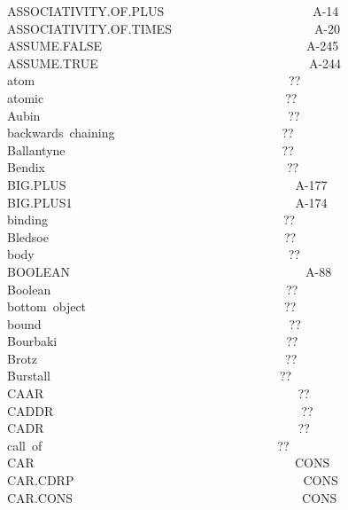 \documentclass[11pt]{book}
\newenvironment{pubasis}{\begin{flushleft}\ttfamily\small}{\normalsize\rmfamily\end{flushleft}}
\begin{document}
\begin{pubasis}
ASSOC\-IATIV\-ITY.OF.PLUS~~~~~~~~~~~~~~~~~~~~~~~~A-14\\
ASSOC\-IATIV\-ITY.OF.TIMES~~~~~~~~~~~~~~~~~~~~~~~A-20\\
AS\-SUME.FALSE~~~~~~~~~~~~~~~~~~~~~~~~~~~~~~~~~A-245\\
AS\-SUME.TRUE~~~~~~~~~~~~~~~~~~~~~~~~~~~~~~~~~~A-244\\
atom~~~~~~~~~~~~~~~~~~~~~~~~~~~~~~~~~~~~~~~~~??\\
atomic~~~~~~~~~~~~~~~~~~~~~~~~~~~~~~~~~~~~~~~??\\
Aubin~~~~~~~~~~~~~~~~~~~~~~~~~~~~~~~~~~~~~~~~??\\
backwards~chaining~~~~~~~~~~~~~~~~~~~~~~~~~~~??\\
Ballantyne~~~~~~~~~~~~~~~~~~~~~~~~~~~~~~~~~~~??\\
Bendix~~~~~~~~~~~~~~~~~~~~~~~~~~~~~~~~~~~~~~~??\\
BIG.PLUS~~~~~~~~~~~~~~~~~~~~~~~~~~~~~~~~~~~~~A-177\\
BIG.PLUS1~~~~~~~~~~~~~~~~~~~~~~~~~~~~~~~~~~~~A-174\\
binding~~~~~~~~~~~~~~~~~~~~~~~~~~~~~~~~~~~~~~??\\
Bledsoe~~~~~~~~~~~~~~~~~~~~~~~~~~~~~~~~~~~~~~??\\
body~~~~~~~~~~~~~~~~~~~~~~~~~~~~~~~~~~~~~~~~~??\\
BOOLEAN~~~~~~~~~~~~~~~~~~~~~~~~~~~~~~~~~~~~~~A-88\\
Boolean~~~~~~~~~~~~~~~~~~~~~~~~~~~~~~~~~~~~~~??\\
bottom~object~~~~~~~~~~~~~~~~~~~~~~~~~~~~~~~~??\\
bound~~~~~~~~~~~~~~~~~~~~~~~~~~~~~~~~~~~~~~~~??\\
Bourbaki~~~~~~~~~~~~~~~~~~~~~~~~~~~~~~~~~~~~~??\\
Brotz~~~~~~~~~~~~~~~~~~~~~~~~~~~~~~~~~~~~~~~~??\\
Burstall~~~~~~~~~~~~~~~~~~~~~~~~~~~~~~~~~~~~~??\\
CAAR~~~~~~~~~~~~~~~~~~~~~~~~~~~~~~~~~~~~~~~~~??\\
CADDR~~~~~~~~~~~~~~~~~~~~~~~~~~~~~~~~~~~~~~~~??\\
CADR~~~~~~~~~~~~~~~~~~~~~~~~~~~~~~~~~~~~~~~~~??\\
call~of~~~~~~~~~~~~~~~~~~~~~~~~~~~~~~~~~~~~~~??\\
CAR~~~~~~~~~~~~~~~~~~~~~~~~~~~~~~~~~~~~~~~~~~CONS\\
CAR.CDRP~~~~~~~~~~~~~~~~~~~~~~~~~~~~~~~~~~~~~CONS\\
CAR.CONS~~~~~~~~~~~~~~~~~~~~~~~~~~~~~~~~~~~~~CONS\\

\end{pubasis}
\end{document}
